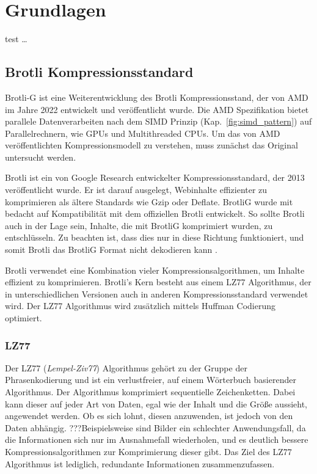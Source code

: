 \section{Grundlagen}

test \ldots

\subsection{Brotli Kompressionsstandard}
\label{subsec:brotli}
Brotli-G ist eine Weiterentwicklung des Brotli Kompressionsstand, der von AMD im Jahre 2022 entwickelt und veröffentlicht wurde.
Die AMD Spezifikation bietet parallele Datenverarbeiten nach dem SIMD Prinzip (Kap.~\ref{fig:simd_pattern}) auf Parallelrechnern, wie GPUs und Multithreaded CPUs.
Um das von AMD veröffentlichten Kompressionsmodell zu verstehen, muss zunächst das Original untersucht werden. \newline

Brotli ist ein von Google Research entwickelter Kompressionsstandard, der 2013 veröffentlicht wurde.
Er ist darauf ausgelegt, Webinhalte effizienter zu komprimieren als ältere Standards wie Gzip oder Deflate.
BrotliG wurde mit bedacht auf Kompatibilität mit dem offiziellen Brotli entwickelt.
So sollte Brotli auch in der Lage sein, Inhalte, die mit BrotliG komprimiert wurden, zu entschlüsseln.
Zu beachten ist, dass dies nur in diese Richtung funktioniert, und somit Brotli das BrotliG Format nicht dekodieren kann  \cite{BrotliG2022}.

Brotli verwendet eine Kombination vieler Kompressionsalgorithmen, um Inhalte effizient zu komprimieren. 
Brotli's Kern besteht aus einem LZ77 Algorithmus, der in unterschiedlichen Versionen auch in anderen Kompressionsstandard verwendet wird.
Der LZ77 Algorithmus wird zusätzlich mittels Huffman Codierung optimiert.

\subsubsection{LZ77}
\label{subsubsec:lz77}
Der LZ77 (\textit{Lempel-Ziv77}) Algorithmus gehört zu der Gruppe der Phrasenkodierung und ist ein verlustfreier, auf einem Wörterbuch basierender Algorithmus.
Der Algorithmus komprimiert sequentielle Zeichenketten.
Dabei kann dieser auf jeder Art von Daten, egal wie der Inhalt und die Größe aussieht, angewendet werden.
Ob es sich lohnt, diesen anzuwenden, ist jedoch von den Daten abhängig.
???Beispielsweise sind Bilder ein schlechter Anwendungsfall, da die Informationen sich nur im Ausnahmefall wiederholen, und es deutlich bessere Kompressionsalgorithmen zur Komprimierung dieser gibt.
Das Ziel des LZ77 Algorithmus ist lediglich, redundante Informationen zusammenzufassen. \newline

